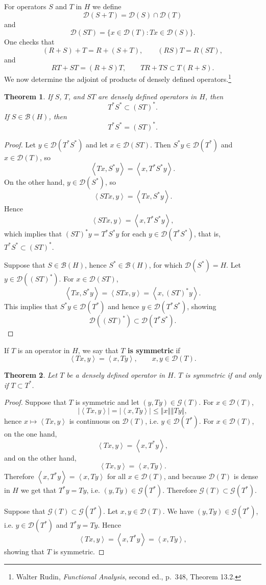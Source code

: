 \documentclass{article}
\newcommand{\inner}[2]{\left\langle #1, #2 \right\rangle}
\newcommand{\norm}[1]{\left\Vert #1 \right\Vert}
\newtheorem{theorem}{Theorem}
\theoremstyle{definition}
\begin{document}
For operators $S$ and $T$ in $H$ we define
\[
\mathscr{D}(S+T) = \mathscr{D}(S) \cap \mathscr{D}(T)
\]
and
\[
\mathscr{D}(ST) = \{x \in \mathscr{D}(T): Tx \in \mathscr{D}(S)\}.
\]
One checks that
\[
(R+S)+T = R+(S+T), \qquad (RS)T=R(ST),
\]
and
\[
RT+ST = (R+S)T, \qquad TR+TS \subset T(R+S).
\]
We now determine the adjoint of products of densely defined operators.\footnote{Walter Rudin,
{\em Functional Analysis}, second ed., p.~348, Theorem 13.2.}

\begin{theorem}
If $S$, $T$, and $ST$ are densely defined operators in $H$, then
\[
T^*S^* \subset (ST)^*.
\]
If $S \in \mathscr{B}(H)$, then
\[
T^*S^* = (ST)^*.
\]
\end{theorem}
\begin{proof}
Let $y \in \mathscr{D}(T^*S^*)$ and let $x \in \mathscr{D}(ST)$. 
Then $S^* y \in \mathscr{D}(T^*)$ and $x \in \mathscr{D}(T)$, so
\[
\inner{Tx}{S^*y} = \inner{x}{T^* S^*y}.
\]
On the other hand, $y \in \mathscr{D}(S^*)$, so
\[
\inner{STx}{y} = \inner{Tx}{S^*y}.
\]
Hence
\[
\inner{STx}{y} = \inner{x}{T^* S^*y},
\]
which implies that $(ST)^*y = T^*S^*y$ for each $y \in \mathscr{D}(T^*S^*)$, that is,
$T^*S^* \subset (ST)^*$.

Suppose that $S \in \mathscr{B}(H)$, hence
$S^* \in \mathscr{B}(H)$, for which $\mathscr{D}(S^*)=H$.
Let $y \in \mathscr{D}((ST)^*)$.
For $x \in \mathscr{D}(ST)$,
\[
\inner{Tx}{S^*y} = \inner{STx}{y} = \inner{x}{(ST)^*y}.
\]
This implies that $S^*y \in \mathscr{D}(T^*)$ and hence $y \in \mathscr{D}(T^*S^*)$, showing
\[
\mathscr{D}((ST)^*) \subset \mathscr{D}(T^*S^*).
\] 
\end{proof}

If $T$ is an operator in $H$, we say that \textbf{$T$ is symmetric} if
\[
\inner{Tx}{y} = \inner{x}{Ty}, \qquad x,y \in \mathscr{D}(T).
\]

\begin{theorem}
Let $T$ be a densely defined operator in $H$. $T$ is symmetric if and only if 
$T \subset T^*$.
\end{theorem}
\begin{proof}
Suppose that $T$ is symmetric and let $(y,Ty) \in \mathscr{G}(T)$. For $x \in \mathscr{D}(T)$,
\[
|\inner{Tx}{y}| =  |\inner{x}{Ty}| \leq \norm{x} \norm{Ty},
\]
hence $x \mapsto \inner{Tx}{y}$ is continuous on $\mathscr{D}(T)$, i.e.
 $y \in \mathscr{D}(T^*)$. For $x \in \mathscr{D}(T)$, 
on the one hand,
\[
 \inner{Tx}{y} = \inner{x}{T^* y},
 \]
 and on the other hand,
 \[
 \inner{Tx}{y} = \inner{x}{Ty}.
 \]
 Therefore $\inner{x}{T^*y}=\inner{x}{Ty}$ for all $x \in \mathscr{D}(T)$, and because $\mathscr{D}(T)$ is dense
 in $H$ we get that $T^*y=Ty$, i.e.
 $(y,Ty) \in \mathscr{G}(T^*)$. Therefore
 $\mathscr{G}(T) \subset \mathscr{G}(T^*)$.
 
 Suppose that $\mathscr{G}(T) \subset \mathscr{G}(T^*)$. 
 Let $x,y \in \mathscr{D}(T)$. We have
 $(y,Ty) \in \mathscr{G}(T^*)$, i.e.
 $y \in \mathscr{D}(T^*)$ and
 $T^*y= Ty$. Hence 
  \[
 \inner{Tx}{y} = 
 \inner{x}{T^*y} = \inner{x}{Ty},
 \]
 showing that $T$ is symmetric.
\end{proof}
\end{document}
